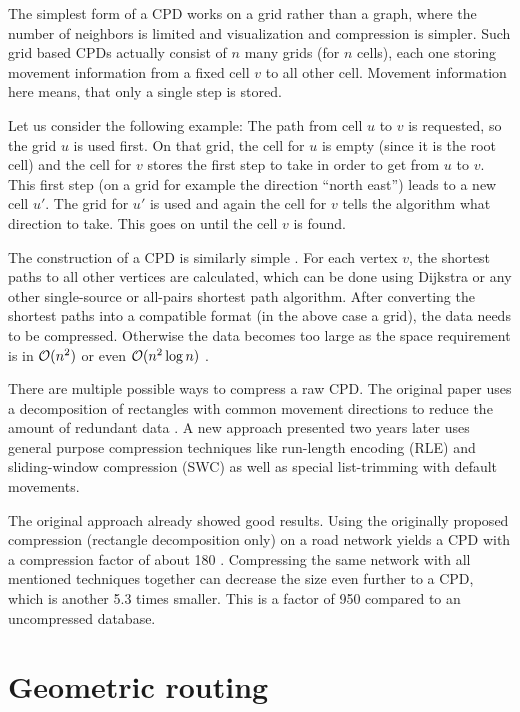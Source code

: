 			The simplest form of a CPD works on a grid rather than a graph, where the number of neighbors is limited and visualization and compression is simpler.
			Such grid based CPDs actually consist of $n$ many grids (for $n$ cells), each one storing movement information from a fixed cell $v$ to all other cell.
			Movement information here means, that only a single step is stored.
			
			Let us consider the following example:
			The path from cell $u$ to $v$ is requested, so the grid $u$ is used first.
			On that grid, the cell for $u$ is empty (since it is the root cell) and the cell for $v$ stores the first step to take in order to get from $u$ to $v$.
			This first step (on a grid for example the direction \enquote{north east}) leads to a new cell $u'$.
			The grid for $u'$ is used and again the cell for $v$ tells the algorithm what direction to take.
			This goes on until the cell $v$ is found.
			
			The construction of a CPD is similarly simple \cite[2]{botea-cpd-2013}.
			For each vertex $v$, the shortest paths to all other vertices are calculated, which can be done using Dijkstra or any other single-source or all-pairs shortest path algorithm.
			After converting the shortest paths into a compatible format (in the above case a grid), the data needs to be compressed.
			Otherwise the data becomes too large as the space requirement is in $\mathcal{O}(n^2)$ or even $\mathcal{O}(n^2 \log n)$ \cite[1]{botea-cpd-2013}.
			
			There are multiple possible ways to compress a raw CPD.
			The original paper uses a decomposition of rectangles with common movement directions to reduce the amount of redundant data \cite[1]{botea-cpd-2011}.
			A new approach presented two years later uses general purpose compression techniques like run-length encoding (RLE) and sliding-window compression (SWC) as well as special list-trimming with default movements.
			
			The original approach already showed good results.
			Using the originally proposed compression (rectangle decomposition only) on a road network yields a CPD with a compression factor of about 180 \cite[4]{botea-cpd-2013}.
			Compressing the same network with all mentioned techniques together can decrease the size even further to a CPD, which is another 5.3 times smaller.
			This is a factor of 950 compared to an uncompressed database.
	
\section{Geometric routing}
\label{sec:geometric-routing}

